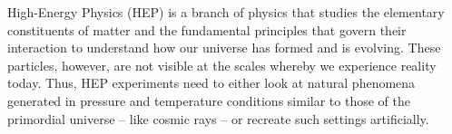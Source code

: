 
High-Energy Physics (HEP) is a branch of physics that studies the elementary constituents of matter and the fundamental principles that govern their interaction to understand how our universe has formed and is evolving.  
These particles, however, are not visible at the scales whereby we experience reality today. 
Thus, HEP experiments need to either look at natural phenomena generated in pressure and temperature conditions similar to those of the primordial universe -- like cosmic rays -- or recreate such settings artificially.

